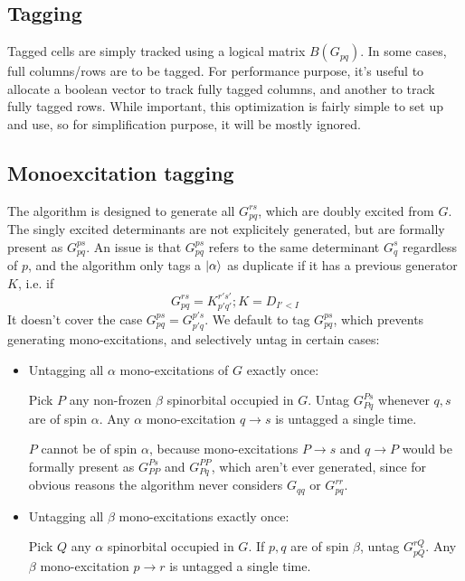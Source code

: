 \documentclass[./thesis.tex]{subfiles}
\begin{document}
\subsection{Tagging}

Tagged cells are simply tracked using a logical matrix $B(G_{pq})$.
In some cases, full columns/rows are to be tagged. For performance purpose, it's useful to allocate a boolean vector to track fully tagged columns, and another to track fully tagged rows. While important, this optimization is fairly simple to set up and use, so for simplification purpose, it will be mostly ignored.


\subsection{Monoexcitation tagging}

The algorithm is designed to generate all $G_{pq}^{rs}$, which are doubly excited from $G$. The singly excited determinants are not explicitely generated, but are formally present as $G_{pq}^{ps}$.
An issue is that $G_{pq}^{ps}$ refers to the same determinant $G_q^s$ regardless of $p$, and the algorithm only tags a $\ket \alpha$ as duplicate if it has a previous generator $K$, i.e. if
$$G_{pq}^{rs} = {K}_{p'q'}^{r's'} ; K = D_{I'<I}$$
It doesn't cover the case $G_{pq}^{ps} = G_{p'q}^{p's}$.
We default to tag $G_{pq}^{ps}$, which prevents generating mono-excitations, and selectively untag in certain cases:


\begin{itemize}
\item
Untagging all $\alpha$ mono-excitations of $G$ exactly once:

Pick $P$ any non-frozen $\beta$ spinorbital occupied in $G$. Untag $G_{Pq}^{Ps}$ whenever $q,s$ are of spin $\alpha$. Any $\alpha$ mono-excitation $q \rightarrow  s$ is untagged a single time.

$P$ cannot be of spin $\alpha$, because mono-excitations $P \rightarrow  s$ and $q \rightarrow  P$ would be formally present as $G_{PP}^{Ps}$ and $G_{Pq}^{PP}$, which aren't ever generated, since for obvious reasons the algorithm never considers $G_{qq}$ or $G_{pq}^{rr}$.
\item
Untagging all $\beta$ mono-excitations exactly once:

Pick $Q$ any $\alpha$ spinorbital occupied in $G$. If $p,q$ are of spin $\beta$, untag $G_{pQ}^{rQ}$. Any $\beta$ mono-excitation $p \rightarrow  r$ is untagged a single time.
\end{itemize}
\end{document}
